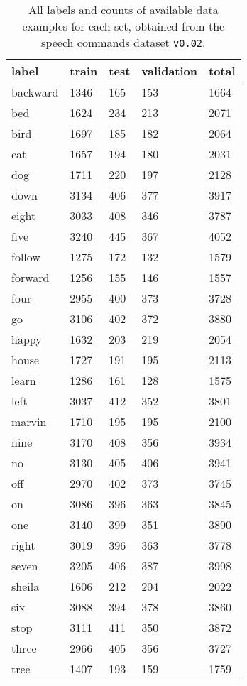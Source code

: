 \begin{table}[ht!]
\small
\begin{center}
\caption{All labels and counts of available data examples for each set, obtained from the speech commands dataset \texttt{v0.02}.}
\begin{tabular}{ M{2cm}  M{1.75cm}  M{1.75cm}  M{1.75cm}  M{1.75cm} }
\toprule
\textbf{label} & \textbf{train} & \textbf{test} & \textbf{validation} & \textbf{total} \\
\midrule
backward & 1346 & 165 & 153 & 1664 \\
bed & 1624 & 234 & 213 & 2071 \\
bird & 1697 & 185 & 182 & 2064 \\
cat & 1657 & 194 & 180 & 2031 \\
dog & 1711 & 220 & 197 & 2128 \\
down & 3134 & 406 & 377 & 3917 \\
eight & 3033 & 408 & 346 & 3787 \\
five & 3240 & 445 & 367 & 4052 \\
follow & 1275 & 172 & 132 & 1579 \\
forward & 1256 & 155 & 146 & 1557 \\
four & 2955 & 400 & 373 & 3728 \\
go & 3106 & 402 & 372 & 3880 \\
happy & 1632 & 203 & 219 & 2054 \\
house & 1727 & 191 & 195 & 2113 \\
learn & 1286 & 161 & 128 & 1575 \\
left & 3037 & 412 & 352 & 3801 \\
marvin & 1710 & 195 & 195 & 2100 \\
nine & 3170 & 408 & 356 & 3934 \\
no & 3130 & 405 & 406 & 3941 \\
off & 2970 & 402 & 373 & 3745 \\
on & 3086 & 396 & 363 & 3845 \\
one & 3140 & 399 & 351 & 3890 \\
right & 3019 & 396 & 363 & 3778 \\
seven & 3205 & 406 & 387 & 3998 \\
sheila & 1606 & 212 & 204 & 2022 \\
six & 3088 & 394 & 378 & 3860 \\
stop & 3111 & 411 & 350 & 3872 \\
three & 2966 & 405 & 356 & 3727 \\
tree & 1407 & 193 & 159 & 1759 \\

\end{tabular}
\end{center}
\end{table}
